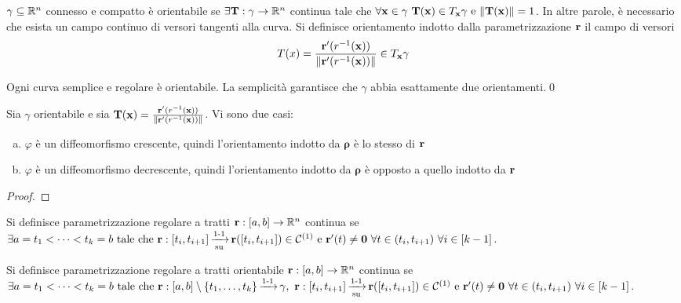 \begin{definition}
	$\gamma \subseteq \mathbb{R}^n$ connesso e compatto è orientabile se $\exists \vb{T}: \gamma \to \mathbb{R}^n$ continua tale che $\forall \vb{x} \in \gamma \ \vb{T}(\vb{x})\in T_{\vb{x}}\gamma \text{ e } \norm{\vb{T}(\vb{x})}=1$. In altre parole, è necessario che esista un campo continuo di versori tangenti alla curva. Si definisce orientamento indotto dalla parametrizzazione $\vb{r}$ il campo di versori
	$$
		T(x)=\frac{\vb{r}'(r^{-1}(\vb{x}))}{\norm{\vb{r}'(r^{-1}(\vb{x}))}} \in T_{\vb{x}}\gamma
	$$
\end{definition}

\begin{lemma}
	Ogni curva semplice e regolare è orientabile. La semplicità garantisce che $\gamma$ abbia esattamente due orientamenti.\qed
\end{lemma}

\begin{theorem}
	Sia $\gamma$ orientabile e sia $\vb{T}(\vb{x})=\frac{\vb{r}'(r^{-1}(\vb{x}))}{\norm{\vb{r}'(r^{-1}(\vb{x}))}}$. Vi sono due casi:
	\begin{enumerate}[a.]
		\item $\varphi$ è un diffeomorfismo crescente, quindi l'orientamento indotto da $\bm\rho$ è lo stesso di $\vb{r}$
		\item $\varphi$ è un diffeomorfismo decrescente, quindi l'orientamento indotto da $\bm\rho$ è opposto a quello indotto da $\vb{r}$
	\end{enumerate}
\end{theorem}

\begin{proof}
\end{proof}

\begin{definition}
	Si definisce parametrizzazione regolare a tratti $\vb{r}:[a,b]\to \mathbb{R}^n$ continua se $\exists a=t_1<\cdots<t_k=b \text{ tale che } \vb{r}:[t_i, t_{i+1}]\operatorname{\xrightarrow[\operatorname{su}]{\operatorname{1-1}}} \vb{r}([t_i,t_{i+1}]) \in \mathcal{C}^{(1)} \text{ e } \vb{r}'(t)\neq \vb{0} \ \forall t \in (t_i,t_{i+1}) \ \forall i \in [k-1]$.
\end{definition}

\begin{definition}
	Si definisce parametrizzazione regolare a tratti orientabile $\vb{r}: [a,b]\to\mathbb{R}^n$ continua se $\exists a=t_1<\cdots<t_k=b \tc \vb{r}:[a,b]\setminus \{t_1,\dots,t_k\} \injarrow \gamma, \ \vb{r}:[t_i,t_{i+1}]\bijarrow \vb{r}([t_i,t_{i+1}]) \in \C{1} \e \vb{r}'(t)\neq \vb{0} \ \forall t \in (t_i,t_{i+1}) \ \forall i \in [k-1]$.
\end{definition}

